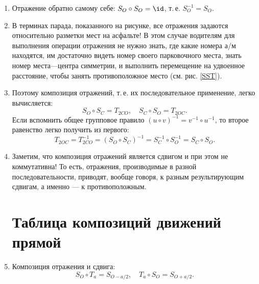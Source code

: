 \begin{enumerate}
\item Отражение обратно самому себе: $S_O\circ S_O=\id$, т.\,е. $S_O^{-1}=S_O$.
\item В терминах парада, показанного на рисунке, все отражения задаются относительно разметки мест на асфальте! В этом случае водителям для выполнения операции отражения не нужно знать, где какие номера а/м находятся, им достаточно видеть номер своего парковочного места, знать номер места---центра симметрии, и выполнить перемещение на удвоенное расстояние, чтобы занять противоположное место (см. рис. \ref{SST}).
\item Поэтому композиция отражений, т.\,е. их последовательное применение, легко вычисляется:
\begin{equation}\label{SOSC}
S_O\circ S_C=T_{2CO},\quad S_C\circ S_O=T_{2OC}.
\end{equation}
Если вспомнить общее групповое правило $(u\circ v)^{-1} = v^{-1}\circ u^{-1}$, то второе равенство легко получить из первого:
$$
T_{2OC} = T_{2CO}^{-1} = (S_O\circ S_C)^{-1} = S_C^{-1}\circ S_O^{-1}=S_C\circ S_O.
$$
\item Заметим, что композиция отражений является сдвигом и при этом не коммутативна! То есть, отражения, производимые в разной последовательности, приводят, вообще говоря, к разным результирующим сдвигам, а именно --- к противоположным.



\section{Таблица композиций движений прямой}




\item Композиция отражения и сдвига:
\begin{equation}\label{SOTa}
S_O\circ T_a = S_{O-a/2},\quad T_a\circ S_O = S_{O+a/2}.
\end{equation}


\end{enumerate}

